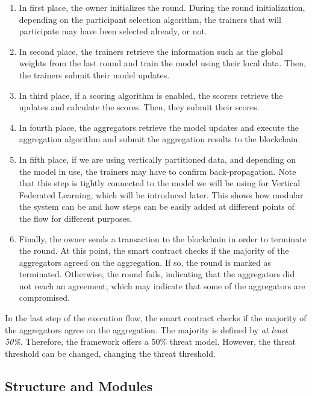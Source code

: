 \begin{enumerate}
    \item In first place, the owner initializes the round. During the round initialization, depending on the participant selection algorithm, the trainers that will participate may have been selected already, or not.
    
    \item In second place, the trainers retrieve the information such as the global weights from the last round and train the model using their local data. Then, the trainers submit their model updates.
    
    \item In third place, if a scoring algorithm is enabled, the scorers retrieve the updates and calculate the scores. Then, they submit their scores.
    
    \item In fourth place, the aggregators retrieve the model updates and execute the aggregation algorithm and submit the aggregation results to the blockchain.
    
    \item In fifth place, if we are using vertically partitioned data, and depending on the model in use, the trainers may have to confirm back-propagation. Note that this step is tightly connected to the model we will be using for Vertical Federated Learning, which will be introduced later. This shows how modular the system can be and how steps can be easily added at different points of the flow for different purposes.
    
    \item Finally, the owner sends a transaction to the blockchain in order to terminate the round. At this point, the smart contract checks if the majority of the aggregators agreed on the aggregation. If so, the round is marked as terminated. Otherwise, the round fails, indicating that the aggregators did not reach an agreement, which may indicate that some of the aggregators are compromised.
\end{enumerate}

In the last step of the execution flow, the smart contract checks if the majority of the aggregators agree on the aggregation. The majority is defined by \textit{at least 50\%}. Therefore, the framework offers a 50\% threat model. However, the threat threshold can be changed, changing the threat threshold.

\subsection{Structure and Modules}\label{meth:struct_modules}

